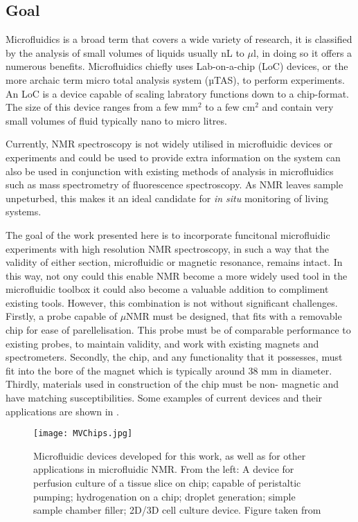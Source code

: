 \subsection{Goal}

Microfluidics is a broad term that covers a wide variety of research, it is classified by the analysis of
small volumes of liquids usually nL to $\mu$l, in doing so it offers a numerous benefits. Microfluidics
chiefly uses Lab-on-a-chip (LoC) devices, or the more archaic term micro total analysis system (µTAS), to
perform experiments. An LoC is a device capable of scaling labratory functions down to a chip-format. The
size of this device ranges from a few mm$^2$ to a few cm$^2$ and contain very small volumes of fluid
typically nano to micro litres.

Currently, NMR spectroscopy is not widely utilised in microfluidic devices or experiments and could be
used to provide extra information on the system can also be used in conjunction with existing methods of
analysis in microfluidics such as mass spectrometry of fluorescence spectroscopy.
As NMR leaves sample unpeturbed, this makes it an ideal candidate for \textit{in situ} monitoring of
living systems.

The goal of the work presented here is to incorporate funcitonal microfluidic experiments with high
resolution NMR spectroscopy, in such a way that the validity of either section, microfluidic or magnetic
resonance, remains intact. In this way, not ony could this enable NMR become a more widely used tool in the
microfluidic toolbox it could also become a valuable addition to compliment existing tools. However,
this combination is not without significant challenges. Firstly, a probe capable of $\mu$NMR must be
designed, that fits with a removable chip for ease of parellelisation. This probe must be of comparable
performance to existing probes, to maintain validity, and work with existing magnets and spectrometers.
Secondly, the chip, and any functionality that it possesses, must fit into the bore of the magnet which is
typically around 38 mm in diameter. Thirdly, materials used in construction of the chip must be non-
magnetic and have matching susceptibilities. Some examples of current devices and their applications are shown in .

\begin{figure}
  \begin{center}
  \texttt{[image: MVChips.jpg]}
  \end{center}
  \caption{Microfluidic devices developed for this work, as well as for other applications in microfluidic
  NMR. From the left: A device for perfusion culture of a tissue slice on chip; capable of peristaltic
  pumping; hydrogenation on a chip; droplet generation; simple sample chamber filler; 2D/3D cell culture
  device. Figure taken from \citep{RN164}}
  \label{fig:DifferentChips}
\end{figure}

